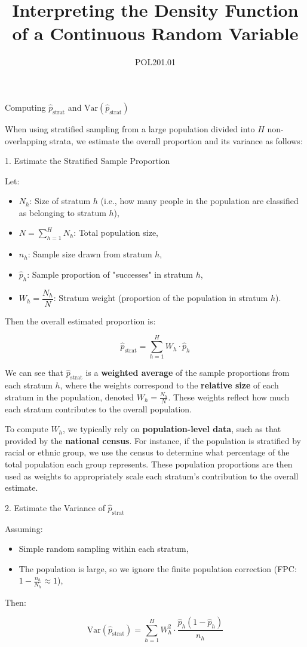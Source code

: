 \documentclass[12pt]{article}
\title{Interpreting the Density Function of a Continuous Random Variable}
\author{POL201.01}
\date{}
\begin{document}
Computing \( \hat{p}_{\text{strat}} \) and \( \text{Var}(\hat{p}_{\text{strat}}) \)

When using stratified sampling from a large population divided into \( H \) non-overlapping strata, we estimate the overall proportion and its variance as follows:


1. Estimate the Stratified Sample Proportion

Let:
\begin{itemize}
    \item  \( N_h \): Size of stratum \( h \) (i.e., how many people in the population are classified as belonging to stratum $h$),
    \item  \( N = \sum_{h=1}^H N_h \): Total population size,
    \item  \( n_h \): Sample size drawn from stratum \( h \),
    \item \( \hat{p}_h \): Sample proportion of "successes" in stratum \( h \),
    \item \( W_h = \dfrac{N_h}{N} \): Stratum weight (proportion of the population in stratum \( h \)).
\end{itemize}

Then the overall estimated proportion is:

\[
\hat{p}_{\text{strat}} = \sum_{h=1}^{H} W_h \cdot \hat{p}_h
\]

We can see that \( \hat{p}_{\text{strat}} \) is a \textbf{weighted average} of the sample proportions from each stratum \( h \), where the weights correspond to the \textbf{relative size} of each stratum in the population, denoted \( W_h = \frac{N_h}{N} \). These weights reflect how much each stratum contributes to the overall population.

To compute \( W_h \), we typically rely on \textbf{population-level data}, such as that provided by the \textbf{national census}. For instance, if the population is stratified by racial or ethnic group, we use the census to determine what percentage of the total population each group represents. These population proportions are then used as weights to appropriately scale each stratum’s contribution to the overall estimate.


2. Estimate the Variance of \( \hat{p}_{\text{strat}} \)

Assuming:
\begin{itemize}
    \item Simple random sampling within each stratum,
    \item The population is large, so we ignore the finite population correction (FPC: \( 1 - \frac{n_h}{N_h} \approx 1 \)),
\end{itemize}

Then:

\[
\text{Var}(\hat{p}_{\text{strat}}) = \sum_{h=1}^{H} W_h^2 \cdot \frac{\hat{p}_h (1 - \hat{p}_h)}{n_h}
\]
\end{document}
